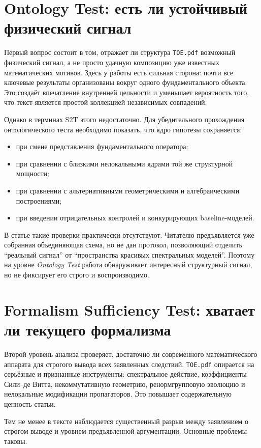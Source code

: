 \documentclass[12pt,a4paper]{article}
\begin{document}
\section{Ontology Test: есть ли устойчивый физический сигнал}

Первый вопрос состоит в том, отражает ли структура \texttt{TOE.pdf} возможный физический сигнал, а не просто удачную композицию уже известных математических мотивов. Здесь у работы есть сильная сторона: почти все ключевые результаты организованы вокруг одного фундаментального объекта. Это создаёт впечатление внутренней цельности и уменьшает вероятность того, что текст является простой коллекцией независимых совпадений.

Однако в терминах S2T этого недостаточно. Для убедительного прохождения онтологического теста необходимо показать, что ядро гипотезы сохраняется:
\begin{itemize}
    \item при смене представления фундаментального оператора;
    \item при сравнении с близкими нелокальными ядрами той же структурной мощности;
    \item при сравнении с альтернативными геометрическими и алгебраическими построениями;
    \item при введении отрицательных контролей и конкурирующих baseline-моделей.
\end{itemize}

В статье такие проверки практически отсутствуют. Читателю предъявляется уже собранная объединяющая схема, но не дан протокол, позволяющий отделить ``реальный сигнал'' от ``пространства красивых спектральных моделей''. Поэтому на уровне \emph{Ontology Test} работа обнаруживает интересный структурный сигнал, но не фиксирует его строго и воспроизводимо.

\section{Formalism Sufficiency Test: хватает ли текущего формализма}

Второй уровень анализа проверяет, достаточно ли современного математического аппарата для строгого вывода всех заявленных следствий. \texttt{TOE.pdf} опирается на серьёзные и признанные инструменты: спектральное действие, коэффициенты Сили--де Витта, некоммутативную геометрию, ренормгрупповую эволюцию и нелокальные модификации пропагаторов. Это повышает содержательную ценность статьи.

Тем не менее в тексте наблюдается существенный разрыв между заявлением о строгом выводе и уровнем предъявленной аргументации. Основные проблемы таковы.
\end{document}

